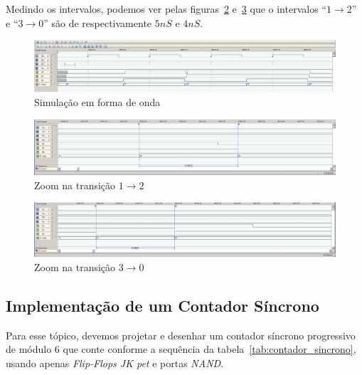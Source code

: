 \documentclass[12pt]{article}
\begin{document}
Medindo os intervalos, podemos ver pelas figuras~\ref{fig:2.1.3.wave.2.1.png}
e~\ref{fig:2.1.3.wave.2.2.png} que o intervalos ``$1 \rightarrow 2$'' e
``$3 \rightarrow 0$'' são de respectivamente $5nS$ e $4nS$.

\begin{figure}[H]
  \centering
  \includegraphics[width=1\textwidth]{Exp09/images/2.1.3.wave.1.png}
  \caption{Simulação em forma de onda}\label{fig:2.1.3.wave.1.png}
\end{figure}

\begin{figure}[H]
  \centering
  \includegraphics[width=1\textwidth]{Exp09/images/2.1.3.wave.2.1.png}
  \caption{Zoom na transição $1 \rightarrow 2$}\label{fig:2.1.3.wave.2.1.png}
\end{figure}

\begin{figure}[H]
  \centering
  \includegraphics[width=1\textwidth]{Exp09/images/2.1.3.wave.2.2.png}
  \caption{Zoom na transição $3 \rightarrow 0$}\label{fig:2.1.3.wave.2.2.png}
\end{figure}

\subsection{Implementação de um Contador Síncrono}\label{sec:2.4}

Para esse tópico, devemos projetar e desenhar um contador síncrono progressivo
de módulo $6$ que conte conforme a sequência da tabela~\ref{tab:contador_sincrono}, usando apenas
\emph{Flip-Flops JK pet} e portas \emph{NAND}.
\end{document}
